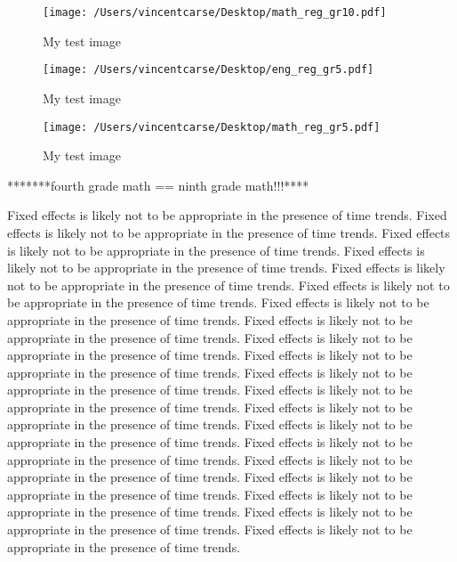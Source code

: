 \documentclass[11pt]{article}
\begin{document}
\begin{figure}
    \label{image-myimage}
    \texttt{[image: /Users/vincentcarse/Desktop/math\_reg\_gr10.pdf]}
    \caption{My test image}
\end{figure}

\begin{figure}
    \label{image-myimage}
    \texttt{[image: /Users/vincentcarse/Desktop/eng\_reg\_gr5.pdf]}
    \caption{My test image}
\end{figure}

\begin{figure}
    \label{image-myimage}
    \texttt{[image: /Users/vincentcarse/Desktop/math\_reg\_gr5.pdf]}
    \caption{My test image}
\end{figure}

*******fourth grade math == ninth grade math!!!****


\FloatBarrier

Fixed effects is likely not to be appropriate in the presence of time trends. 
Fixed effects is likely not to be appropriate in the presence of time trends. 
Fixed effects is likely not to be appropriate in the presence of time trends. 
Fixed effects is likely not to be appropriate in the presence of time trends. 
Fixed effects is likely not to be appropriate in the presence of time trends. 
Fixed effects is likely not to be appropriate in the presence of time trends. 
Fixed effects is likely not to be appropriate in the presence of time trends. 
Fixed effects is likely not to be appropriate in the presence of time trends. 
Fixed effects is likely not to be appropriate in the presence of time trends. 
Fixed effects is likely not to be appropriate in the presence of time trends. 
Fixed effects is likely not to be appropriate in the presence of time trends. 
Fixed effects is likely not to be appropriate in the presence of time trends. 
Fixed effects is likely not to be appropriate in the presence of time trends. 
Fixed effects is likely not to be appropriate in the presence of time trends. 
Fixed effects is likely not to be appropriate in the presence of time trends. 
Fixed effects is likely not to be appropriate in the presence of time trends. 
Fixed effects is likely not to be appropriate in the presence of time trends. 
Fixed effects is likely not to be appropriate in the presence of time trends. 
Fixed effects is likely not to be appropriate in the presence of time trends. 
Fixed effects is likely not to be appropriate in the presence of time trends. 
\end{document}
